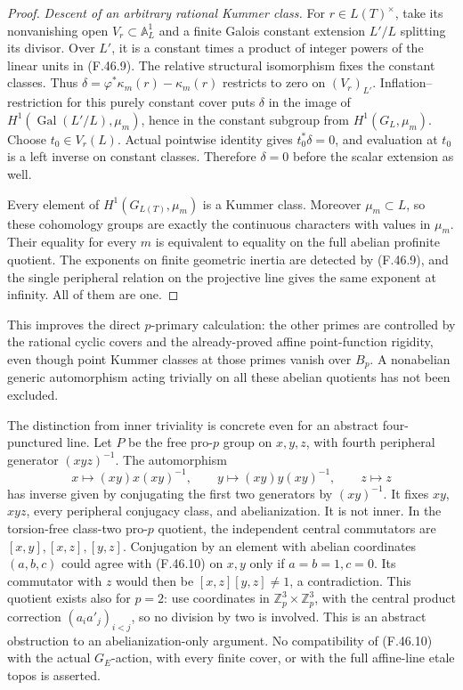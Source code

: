 \documentclass[11pt]{article}
\begin{document}
\begin{proof}
\emph{Descent of an arbitrary rational Kummer class.}
For \(r\in L(T)^\times\), take its nonvanishing
open \(V_r\subset\mathbb A^1_L\) and a finite
Galois constant extension \(L'/L\) splitting its
divisor. Over \(L'\), it is a constant times a product
of integer powers of the linear units in (F.46.9).
The relative structural isomorphism fixes the constant
classes. Thus
\(\delta=\varphi^*\kappa_m(r)-\kappa_m(r)\)
restricts to zero on \((V_r)_{L'}\).
Inflation--restriction for this purely constant cover
puts \(\delta\) in the image of
\(H^1(\operatorname{Gal}(L'/L),\mu_m)\), hence in
the constant subgroup from \(H^1(G_L,\mu_m)\).
Choose \(t_0\in V_r(L)\). Actual pointwise identity
gives \(t_0^*\delta=0\), and evaluation at \(t_0\)
is a left inverse on constant classes. Therefore
\(\delta=0\) before the scalar extension as well.

Every element of \(H^1(G_{L(T)},\mu_m)\) is a
Kummer class. Moreover \(\mu_m\subset L\), so
these cohomology groups are exactly the continuous
characters with values in \(\mu_m\). Their equality
for every \(m\) is equivalent to equality on the full
abelian profinite quotient. The exponents on finite
geometric inertia are detected by (F.46.9), and the
single peripheral relation on the projective line gives
the same exponent at infinity. All of them are one.
\end{proof}

This improves the direct \(p\)-primary calculation:
the other primes are controlled by the rational cyclic
covers and the already-proved affine point-function
rigidity, even though point Kummer classes at those
primes vanish over \(B_p\). A nonabelian generic
automorphism acting trivially on all these abelian
quotients has not been excluded.


The distinction from inner triviality is concrete even
for an abstract four-punctured line. Let \(P\) be the
free pro-\(p\) group on \(x,y,z\), with fourth
peripheral generator \((xyz)^{-1}\). The automorphism
\[
 x\longmapsto(xy)x(xy)^{-1},\qquad
 y\longmapsto(xy)y(xy)^{-1},\qquad
 z\longmapsto z
                                                        \tag{F.46.10}
\]
has inverse given by conjugating the first two generators
by \((xy)^{-1}\). It fixes \(xy\), \(xyz\), every
peripheral conjugacy class, and abelianization. It is not
inner. In the torsion-free class-two pro-\(p\) quotient,
the independent central commutators are
\([x,y],[x,z],[y,z]\). Conjugation by an element with
abelian coordinates \((a,b,c)\) could agree with
(F.46.10) on \(x,y\) only if \(a=b=1,c=0\).
Its commutator with \(z\) would then be
\([x,z][y,z]\ne1\), a contradiction. This quotient
exists also for \(p=2\): use coordinates in
\(\mathbb Z_p^3\times\mathbb Z_p^3\), with the
central product correction
\((a_i a'_j)_{i<j}\), so no division by two is involved.
This is an abstract obstruction to an abelianization-only
argument. No compatibility of (F.46.10) with the actual
\(G_E\)-action, with every finite cover, or with the
full affine-line etale topos is asserted.
\end{document}
